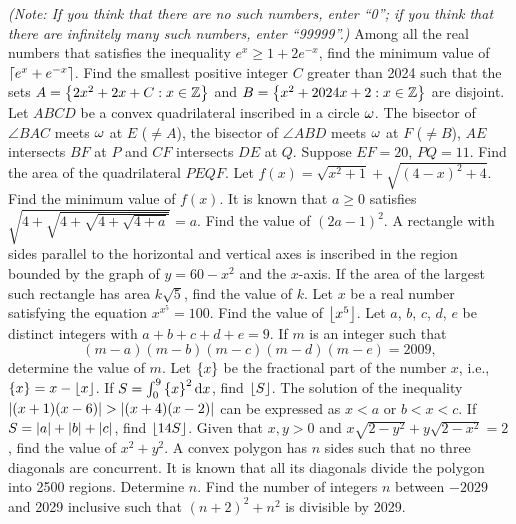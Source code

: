 \begin{enumerate}
    \textit{(Note: If you think that there are no such numbers, enter ``0''; if you think that there are infinitely many such numbers, enter ``99999''.)}
    \hyperrefitem[Q::2024-O-1-5] Among all the real numbers that satisfies the inequality $e^x \geq 1 + 2e^{-x}$, find the minimum value of $\left\lceil e^x + e^{-x} \right\rceil$.
    \hyperrefitem[Q::2024-O-1-6] Find the smallest positive integer $C$ greater than 2024 such that the sets $A = \left\lbrace 2x^2 + 2x + C : x \in \mathbb{Z} \right\rbrace$ and $B = \left\lbrace x^2 + 2024x + 2: x \in \mathbb{Z} \right\rbrace$ are disjoint.
    \hyperrefitem[Q::2024-O-1-7] Let $ABCD$ be a convex quadrilateral inscribed in a circle $\omega$. The bisector of $\angle BAC$ meets $\omega$ at $E$ ($\neq A$), the bisector of $\angle ABD$ meets $\omega$ at $F$ ($\neq B$), $AE$ intersects $BF$ at $P$ and $CF$ intersects $DE$ at $Q$. Suppose $EF = 20$, $PQ = 11$. Find the area of the quadrilateral $PEQF$.
    \hyperrefitem[Q::2024-O-1-8] Let $f(x) = \sqrt{x^2 + 1} + \sqrt{(4-x)^2 + 4}$. Find the minimum value of $f(x)$.
    \hyperrefitem[Q::2024-O-1-9] It is known that $a \geq 0$ satisfies $\sqrt{4 + \sqrt{4 + \sqrt{4 + \sqrt{4 + a}}}} = a$. Find the value of $(2a - 1)^2$.
    \hyperrefitem[Q::2024-O-1-10] A rectangle with sides parallel to the horizontal and vertical axes is inscribed in the region bounded by the graph of $y = 60 - x^2$ and the $x$-axis. If the area of the largest such rectangle has area $k\sqrt 5$, find the value of $k$.
    \hyperrefitem[Q::2024-O-1-11] Let $x$ be a real number satisfying the equation $x^{x^5} = 100$. Find the value of $\left\lfloor x^5 \right\rfloor$.
    \hyperrefitem[Q::2024-O-1-12] Let $a$, $b$, $c$, $d$, $e$ be distinct integers with $a + b + c + d + e = 9$. If $m$ is an integer such that \[(m-a)(m-b)(m-c)(m-d)(m-e) = 2009,\] determine the value of $m$.
    \hyperrefitem[Q::2024-O-1-13] Let $\left\lbrace x \right\rbrace$ be the fractional part of the number $x$, i.e., $\left\lbrace x \right\rbrace = x - \left\lfloor x \right\rfloor$. If $S = \int_0^9 \left\lbrace x \right\rbrace^2 \mathop{\mathrm{d}x}$, find $\left\lfloor S \right\rfloor$.
    \hyperrefitem[Q::2024-O-1-14] The solution of the inequality $\left\lvert (x+1)(x-6) \right\rvert > \left\lvert (x+4)(x-2) \right\rvert$ can be expressed as $x < a$ or $b < x < c$. If $S = \left\lvert a \right\rvert + \left\lvert b \right\rvert + \left\lvert c \right\rvert$, find $\left\lfloor 14S \right\rfloor$.
    \hyperrefitem[Q::2024-O-1-15]Given that $x, y > 0$ and $x\sqrt{2-y^2} + y\sqrt{2-x^2} = 2$, find the value of $x^2 + y^2$.
    \hyperrefitem[Q::2024-O-1-16] A convex polygon has $n$ sides such that no three diagonals are concurrent. It is known that all its diagonals divide the polygon into 2500 regions. Determine $n$.
    \hyperrefitem[Q::2024-O-1-17] Find the number of integers $n$ between $-2029$ and 2029 inclusive such that $(n+2)^2 + n^2$ is divisible by 2029.

\end{enumerate}
